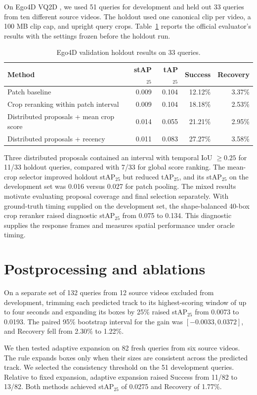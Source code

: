 \documentclass{article}
\begin{document}
On Ego4D VQ2D \citep{ego4d}, we used 51 queries for development and held out 33 queries from ten different source videos. The holdout used one canonical clip per video, a 100 MB clip cap, and upright query crops. Table~\ref{tab:vq} reports the official evaluator's results with the settings frozen before the holdout run.

\begin{table}[h]
\centering
\small
\caption{Ego4D validation holdout results on 33 queries.}
\label{tab:vq}
\begin{tabular}{lrrrr}
\toprule
Method & stAP$_{25}$ & tAP$_{25}$ & Success & Recovery \\
\midrule
Patch baseline & 0.009 & 0.104 & 12.12\% & 3.37\% \\
Crop reranking within patch interval & 0.009 & 0.104 & 18.18\% & 2.53\% \\
Distributed proposals + mean crop score & 0.014 & 0.055 & 21.21\% & 2.95\% \\
Distributed proposals + recency & 0.011 & 0.083 & 27.27\% & 3.58\% \\
\bottomrule
\end{tabular}
\end{table}

Three distributed proposals contained an interval with temporal IoU $\geq 0.25$ for 11/33 holdout queries, compared with 7/33 for global score ranking. The mean-crop selector improved holdout stAP$_{25}$ but reduced tAP$_{25}$, and its stAP$_{25}$ on the development set was 0.016 versus 0.027 for patch pooling. The mixed results motivate evaluating proposal coverage and final selection separately. With ground-truth timing supplied on the development set, the shape-balanced 40-box crop reranker raised diagnostic stAP$_{25}$ from 0.075 to 0.134. This diagnostic supplies the response frames and measures spatial performance under oracle timing.

\section{Postprocessing and ablations}
On a separate set of 132 queries from 12 source videos excluded from development, trimming each predicted track to its highest-scoring window of up to four seconds and expanding its boxes by 25\% raised stAP$_{25}$ from 0.0073 to 0.0193. The paired 95\% bootstrap interval for the gain was $[-0.0033, 0.0372]$, and Recovery fell from 2.30\% to 1.22\%.

We then tested adaptive expansion on 82 fresh queries from six source videos. The rule expands boxes only when their sizes are consistent across the predicted track. We selected the consistency threshold on the 51 development queries. Relative to fixed expansion, adaptive expansion raised Success from 11/82 to 13/82. Both methods achieved stAP$_{25}$ of 0.0275 and Recovery of 1.77\%.
\end{document}
